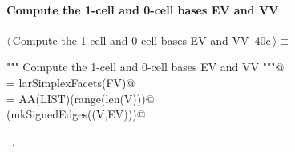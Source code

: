 \documentclass[11pt,oneside]{article}	%
\begin{document}
\paragraph{Compute the 1-cell and 0-cell bases EV and VV}
\begin{flushleft} \small \label{scrap65}
\protect{}$\langle\,$Compute the 1-cell and 0-cell bases EV and VV\nobreak\ {\footnotesize 40c}$\,\rangle\equiv$
\vspace{-1ex}
\begin{list}{}{} \item
\mbox{}\verb@""" Compute the 1-cell and 0-cell bases EV and VV """@\\
\mbox{}\verb@EV = larSimplexFacets(FV)@\\
\mbox{}\verb@VV = AA(LIST)(range(len(V)))@\\
\mbox{}\verb@VIEW(mkSignedEdges((V,EV)))@\\
\mbox{}\verb@@{\NWsep}
\end{list}
\vspace{-1ex}
\footnotesize\addtolength{\baselineskip}{-1ex}
\begin{list}{}{\setlength{\itemsep}{-\parsep}\setlength{\itemindent}{-\leftmargin}}
\item \NWtxtMacroRefIn\ .
\end{list}
\end{flushleft}
\end{document}
